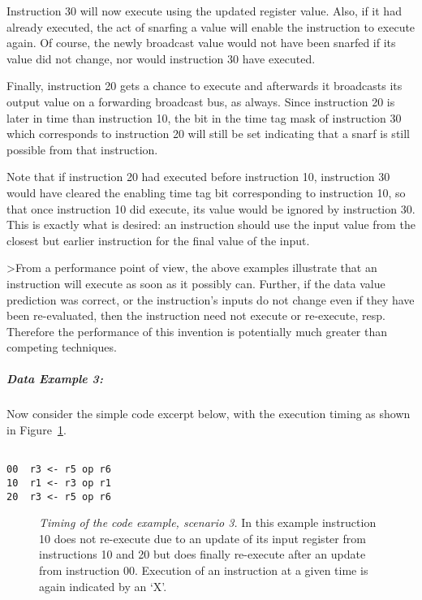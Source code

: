 \documentclass[10pt,dvips]{article}
\begin{document}
Instruction 30 will now execute using the updated register value.
Also, if it had already executed, the act of snarfing a value will
enable the instruction to execute again.  Of course, the newly broadcast
value would not have been snarfed if its value did not change, nor would
instruction 30 have executed.

Finally, instruction 20 gets a chance to execute and afterwards it
broadcasts its output value on a forwarding broadcast bus, as always.
Since instruction 20 is later in time than instruction 10,
the bit in the time tag mask of instruction 30 which corresponds
to instruction 20 will still be set indicating that a snarf
is still possible from that instruction.

Note that if instruction 20 had executed before instruction 10,
instruction 30 would have cleared the enabling time tag bit
corresponding to instruction 10, so that once instruction 10
did execute, its value would be ignored by instruction 30. This
is exactly what is desired: an instruction should use the input
value from the closest but earlier instruction for the final
value of the input.

>From a performance point of view, the above examples illustrate that
an instruction will execute as soon as it possibly can. Further,
if the data value prediction was correct, or the instruction's
inputs do not
change even if they have been re-evaluated, then the instruction
need not execute or re-execute, resp. Therefore the performance of
this invention is potentially much greater than competing techniques.

\subparagraph{Data Example 3: }
Now consider the simple code excerpt below, with the execution timing
as shown in Figure~\ref{ex3}.

\begin{verbatim}

00	r3 <- r5 op r6
10	r1 <- r3 op r1
20	r3 <- r5 op r6

\end{verbatim}

\begin{figure}
\centering
{}
\caption{{\em Timing of the code example, scenario 3.}
In this example instruction 10 does not re-execute due to an update
of its input register from instructions 10 and 20 but does
finally re-execute after an update from instruction 00.
Execution of an instruction at a given time is
again indicated by an `X'.}
\label{ex3}
\end{figure}
\end{document}
